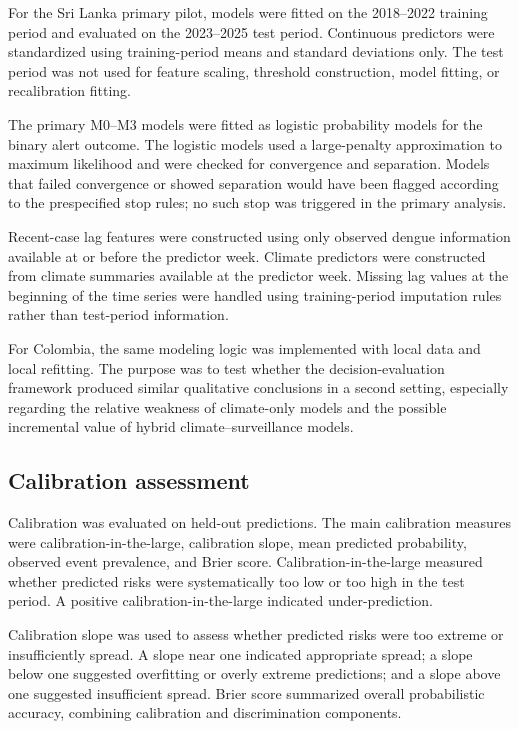 \documentclass[11pt,a4paper]{article}
\begin{document}
For the Sri Lanka primary pilot, models were fitted on the 2018--2022 training period and evaluated on the 2023--2025 test period. Continuous predictors were standardized using training-period means and standard deviations only. The test period was not used for feature scaling, threshold construction, model fitting, or recalibration fitting.

The primary M0--M3 models were fitted as logistic probability models for the binary alert outcome. The logistic models used a large-penalty approximation to maximum likelihood and were checked for convergence and separation. Models that failed convergence or showed separation would have been flagged according to the prespecified stop rules; no such stop was triggered in the primary analysis.

Recent-case lag features were constructed using only observed dengue information available at or before the predictor week. Climate predictors were constructed from climate summaries available at the predictor week. Missing lag values at the beginning of the time series were handled using training-period imputation rules rather than test-period information.

For Colombia, the same modeling logic was implemented with local data and local refitting. The purpose was to test whether the decision-evaluation framework produced similar qualitative conclusions in a second setting, especially regarding the relative weakness of climate-only models and the possible incremental value of hybrid climate--surveillance models.

\subsection{Calibration assessment}
\label{subsec:calibration-assessment}

Calibration was evaluated on held-out predictions. The main calibration measures were calibration-in-the-large, calibration slope, mean predicted probability, observed event prevalence, and Brier score. Calibration-in-the-large measured whether predicted risks were systematically too low or too high in the test period. A positive calibration-in-the-large indicated under-prediction.

Calibration slope was used to assess whether predicted risks were too extreme or insufficiently spread. A slope near one indicated appropriate spread; a slope below one suggested overfitting or overly extreme predictions; and a slope above one suggested insufficient spread. Brier score summarized overall probabilistic accuracy, combining calibration and discrimination components.
\end{document}

